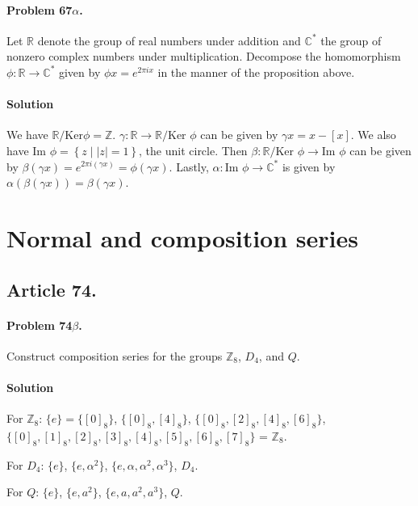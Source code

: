 \paragraph{Problem 67$\alpha$.}
Let $\mathbb{R}$ denote the group of real numbers under addition and
$\mathbb{C}^*$ the group of nonzero complex numbers under multiplication.
Decompose the homomorphism $ \phi : \mathbb{R} \rightarrow \mathbb{C}^*$
given by $\phi x = e^{2 \pi i x}$ in the manner of the proposition above.

\paragraph*{Solution}
We have $\mathbb{R} / \mbox{Ker} \phi = \mathbb{Z}$. $\gamma : \mathbb{R} \rightarrow
\mathbb{R} / \mbox{Ker } \phi $ can be given by $ \gamma x = x - [x] $. We also
have $ \mbox{Im } \phi = \left\{ z \mid |z| = 1\right\}$, the unit circle. Then
$\beta : \mathbb{R} / \mbox{Ker } \phi \rightarrow \mbox{Im } \phi $ can be
given by $ \beta (\gamma x) = e^{2\pi i (\gamma x)} = \phi (\gamma x)$.
Lastly, $\alpha : \mbox{Im } \phi \rightarrow \mathbb{C}^* $ is given by
$ \alpha ( \beta ( \gamma x ) ) = \beta (\gamma x) $.

\section{Normal and composition series}

\subsection{Article 74.}

\paragraph{Problem 74$\beta$.}
Construct composition series for the groups $\mathbb{Z}_8$, $D_4$, and $Q$.

\paragraph*{Solution}
For $\mathbb{Z}_8$: $\{e\} = \{[0]_8\}$, $\{[0]_8, [4]_8\}$, $\{[0]_8, [2]_8, [4]_8, [6]_8\}$,
$\{[0]_8, [1]_8, [2]_8, [3]_8, [4]_8, [5]_8, [6]_8, [7]_8\}$ = $\mathbb{Z}_8$.

For $D_4$: $\{e\}$, $\{e, \alpha^2\}$, $\{e, \alpha, \alpha^2, \alpha^3\}$, $D_4$.

For $Q$: $\{e\}$, $\{e, a^2\}$, $\{e, a, a^2, a^3\}$, $Q$.


